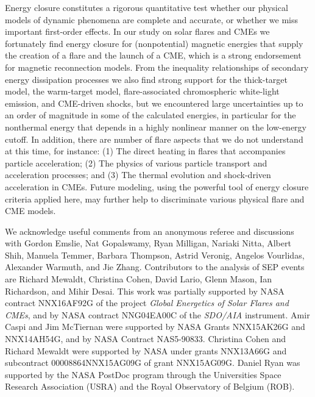 \documentclass[10pt,preprint]{aastex}  %
\begin{document}
Energy closure constitutes a rigorous quantitative test whether
our physical models of dynamic phenomena are complete and
accurate, or whether we miss important first-order effects.
In our study on solar flares and CMEs we fortunately find
energy closure for (nonpotential) magnetic energies that supply
the creation of a flare and the launch of a CME, which
is a strong endorsement for magnetic reconnection models.
From the inequality relationships of secondary energy dissipation
processes we also find strong support for the thick-target model,
the warm-target model, flare-associated chromospheric white-light 
emission, and CME-driven shocks, but we encountered large 
uncertainties up to an order of magnitude in some of the calculated 
energies, in particular for the nonthermal energy that depends
in a highly nonlinear manner on the low-energy cutoff.
In addition, there are number of flare aspects that we do
not understand at this time, for instance: (1) The direct heating in flares
that accompanies particle acceleration; (2) The physics of
various particle transport and acceleration processes; and 
(3) The thermal evolution and shock-driven acceleration in CMEs.
Future modeling, using the powerful tool of energy closure criteria 
applied here, may further help to discriminate various physical 
flare and CME models. 

\bigskip
\acknowledgements
We acknowledge useful comments from an anonymous referee
and discussions with Gordon Emslie, Nat Gopalswamy, Ryan Milligan, 
Nariaki Nitta, Albert Shih, Manuela Temmer, Barbara Thompson, 
Astrid Veronig, Angelos Vourlidas, Alexander Warmuth, and Jie Zhang.
Contributors to the analysis of SEP events are Richard Mewaldt,
Christina Cohen, David Lario, Glenn Mason, Ian Richardson, and
Mihir Desai.
This work was partially supported by NASA contract NNX16AF92G of
the project {\sl Global Energetics of Solar Flares and CMEs},
and by NASA contract NNG04EA00C of the {\it SDO/AIA} instrument. 
Amir Caspi and Jim McTiernan were supported by NASA Grants 
NNX15AK26G and NNX14AH54G, and by NASA Contract NAS5-90833.
Christina Cohen and Richard Mewaldt were supported by NASA 
under grants NNX13A66G and subcontract 00008864NNX15AG09G 
of grant NNX15AG09G.
Daniel Ryan was supported by the NASA PostDoc program through
the Universities Space Research Association (USRA) 
and the Royal Observatory of Belgium (ROB). 


\end{document}
